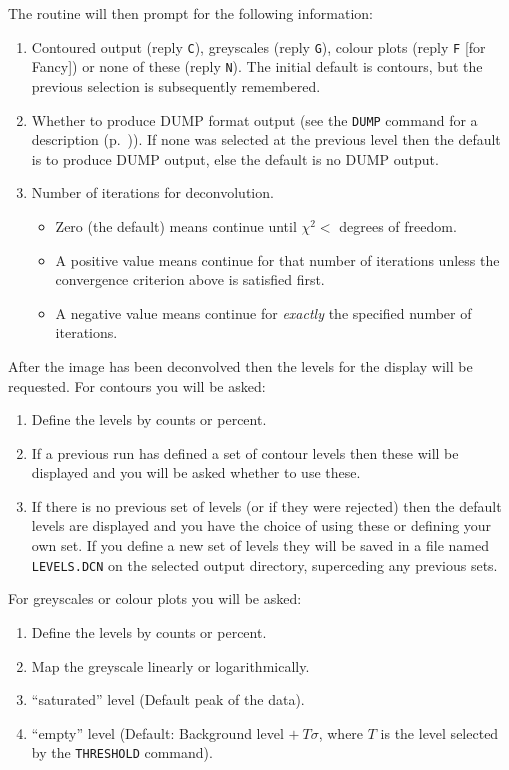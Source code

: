 \begin{description}
The routine will then prompt for the following information:
\begin{enumerate} 
\item Contoured output (reply {\tt C}), greyscales (reply {\tt G}), colour
plots (reply {\tt F} [for Fancy]) or none of these (reply {\tt N}). The
initial default is contours, but the previous selection is subsequently
remembered.
\item Whether to produce DUMP format output (see the {\tt DUMP} command for a 
description (p.~\pageref{du})). If none was selected at the previous
level then the default is to produce DUMP output, else the default is no
DUMP output.
\item Number of iterations for deconvolution. 
\begin{itemize}
\item Zero (the default) means continue until $\chi^2 < $ degrees of freedom.
\item A positive value means continue for that number of iterations unless the
convergence criterion above is satisfied first.
\item A negative value means continue for {\em exactly} the specified number of
iterations.
\end{itemize}
\end{enumerate}

After the image has been deconvolved then the levels for the display
will be requested. For contours you will be asked:
\begin{enumerate}
\item Define the levels by counts or percent.
\item If a previous run has defined a set of contour levels then these will
be displayed and you will be asked whether to use these.
\item If there is no previous set of levels (or if they were rejected) then
the default levels are displayed and you have the choice of using these
or defining your own set. If you define a new set of levels they will
be saved in a file named {\tt LEVELS.DCN} on the selected output
directory, superceding any previous sets.
\end{enumerate}
For greyscales or colour plots you will be asked:
\begin{enumerate}
\item Define the levels by counts or percent.
\item Map the greyscale linearly or logarithmically.
\item ``saturated'' level (Default peak of the data).
\item ``empty'' level (Default: Background level $ +~T\sigma $, where $T$ is
the level selected by the {\tt THRESHOLD} command).
\end{enumerate}


\end{description}
